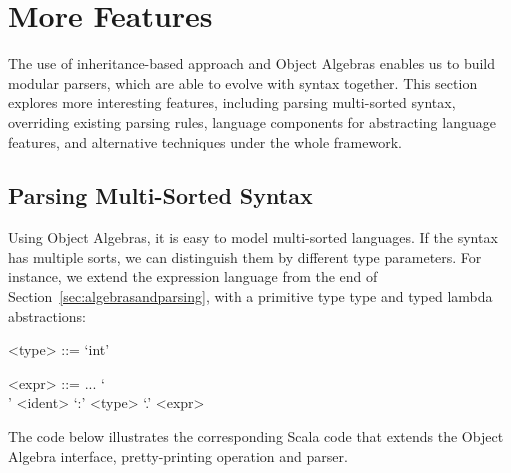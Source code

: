 \vspace{-3pt}
\section{More Features}

The use of inheritance-based approach and Object Algebras enables us
to build modular parsers, which are able to evolve with
syntax together. This section explores more interesting features, including
parsing multi-sorted syntax, overriding existing parsing rules,
language components for abstracting language features, and alternative
techniques under the whole framework.

\subsection{Parsing Multi-Sorted Syntax}\label{subsec:differentsyntax}

\begin{comment}
As illustrated above, using Object Algebras separates data structures from behaviors, thus enabling more modularity and reuse. New language constructs correspond to the new cases in the algebra. Different operations
 on structures, with both code reuse and separate compilation supported.
\end{comment}

Using Object Algebras, it is easy to
model multi-sorted languages. If the syntax has multiple sorts, we can distinguish them by different type parameters.
For instance, we extend the expression language from the end of Section~\ref{sec:algebrasandparsing}, with a
primitive type  type and typed lambda abstractions:

\vspace{-2pt}
\setlength{\grammarindent}{5em}
\begin{grammar}
<type> ::= `int'

<expr> ::=  ... \alt `\\' <ident> `:' <type> `.' <expr>
\end{grammar}
\vspace{-2pt}

The code below illustrates the corresponding Scala code
that extends the Object Algebra interface, pretty-printing operation and parser.

\vspace{-4pt}
\vspace{-4pt}

